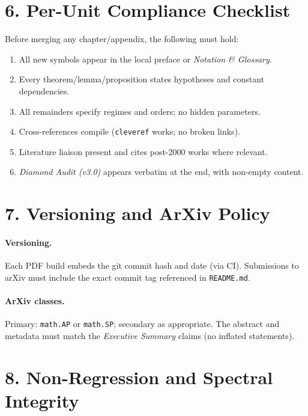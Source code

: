 \section*{6. Per-Unit Compliance Checklist}

Before merging any chapter/appendix, the following must hold:

\begin{enumerate}[label=\textbf{C\arabic*}.]
  \item All new symbols appear in the local preface or \emph{Notation \& Glossary}.
  \item Every theorem/lemma/proposition states hypotheses and constant dependencies.
  \item All remainders specify regimes and orders; no hidden parameters.
  \item Cross-references compile (\verb|cleveref| works; no broken links).
  \item Literature liaison present and cites post-2000 works where relevant.
  \item \emph{Diamond Audit (v3.0)} appears verbatim at the end, with non-empty content.
\end{enumerate}

\section*{7. Versioning and ArXiv Policy}

\paragraph{Versioning.}
Each PDF build embeds the git commit hash and date (via CI). Submissions to arXiv must include the exact commit tag referenced in \texttt{README.md}.

\paragraph{ArXiv classes.}
Primary: \texttt{math.AP} or \texttt{math.SP}; secondary as appropriate. The abstract and metadata must match the \emph{Executive Summary} claims (no inflated statements).

\section*{8. Non-Regression and Spectral Integrity}

